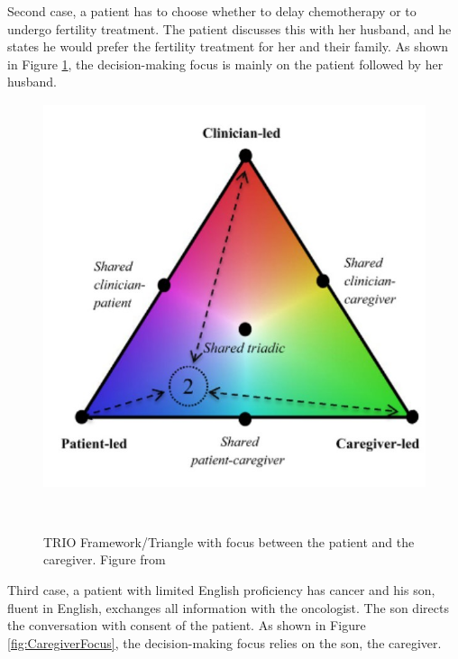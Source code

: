 \documentclass{sigchi}
\begin{document}
Second case, a patient has to choose whether to delay chemotherapy or to undergo fertility treatment. The patient discusses this with her husband, and he states he would prefer the fertility treatment for her and their family. As shown in Figure \ref{fig:PatientFocus}, the decision-making focus is mainly on the patient followed by her husband.

\begin{figure}[H]
\centering
  \includegraphics[width=0.9\columnwidth]{figures/Triangle2Screenshotjpg.jpg}
  \caption{TRIO Framework/Triangle with focus between the patient and the caregiver. Figure from}~\label{fig:PatientFocus}
\end{figure}

Third case, a patient with limited English proficiency has cancer and his son, fluent in English, exchanges all information with the oncologist. The son directs the conversation with consent of the patient. As shown in Figure \ref{fig:CaregiverFocus}, the decision-making focus relies on the son, the caregiver.
\end{document}
